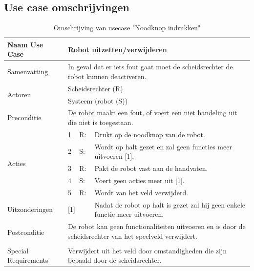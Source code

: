 \documentclass[12pt]{article} %
\begin{document}
\begin{landscape}
\subsection{Use case omschrijvingen}
\begin{table}[htbp]
  \centering
    \begin{tabular}{llll}
    \toprule
    Naam Use Case & \multicolumn{3}{l}{\textbf{Robot uitzetten/verwijderen}} \\
    \midrule
    Samenvatting & \multicolumn{3}{l}{In geval dat er iets fout gaat moet de scheidsrechter de robot kunnen deactiveren.} \\
    \multirow{2}[2]{*}{Actoren} & \multicolumn{3}{l}{Scheidsrechter (R)} \\
          & \multicolumn{3}{l}{Systeem (robot (S))} \\
    Preconditie & \multicolumn{3}{l}{De robot maakt een fout, of voert een niet handeling uit die niet is toegestaan.} \\
    \multirow{5}[10]{*}{Acties} & 1     & R:    & Drukt op de noodknop van de robot. \\
          & 2     & S:    & Wordt op halt gezet en zal geen functies meer uitvoeren [1]. \\
          & 3     & R:    & Pakt de robot vast aan de handvaten. \\
          & 4     & S:    & Voert geen acties meer uit [1]. \\
          & 5     & R:    & Wordt van het veld verwijderd. \\
    Uitzonderingen & \multicolumn{2}{l}{[1]} & Nadat de robot op halt is gezet zal hij geen enkele functie meer uitvoeren. \\
    \multirow{2}[2]{*}{Postconditie} & \multicolumn{3}{l}{De robot kan geen functionaliteiten uitvoeren en is door de scheidsrechter van het speelveld verwijdert.} \\
          & \multicolumn{3}{l}{} \\
    Special Requirements  & \multicolumn{3}{l}{Verwijdert uit het veld door omstandigheden die zijn bepaald door de scheidsrechter.} \\
    \bottomrule
    \end{tabular}%
   \caption{Omschrijving van usecase "Noodknop indrukken"}
  \label{tab:addlabel1}%
\end{table}%
\clearpage
\begin{table}[htbp]

\end{table}
\end{landscape}
\end{document}
